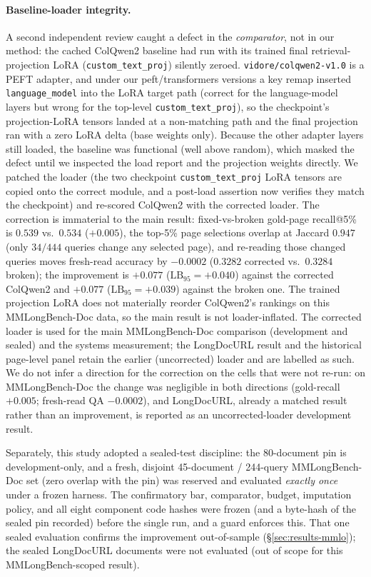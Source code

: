 \documentclass[letterpaper]{article} %
\newcommand{\lb}{\mathrm{LB}_{95}}
\begin{document}
\paragraph{Baseline-loader integrity.} A second independent review caught a defect in the \emph{comparator}, not in our method: the cached ColQwen2 baseline had run with its trained final retrieval-projection LoRA (\texttt{custom\_text\_proj}) silently zeroed. \texttt{vidore/colqwen2-v1.0} is a PEFT adapter, and under our peft/transformers versions a key remap inserted \texttt{language\_model} into the LoRA target path (correct for the language-model layers but wrong for the top-level \texttt{custom\_text\_proj}), so the checkpoint's projection-LoRA tensors landed at a non-matching path and the final projection ran with a zero LoRA delta (base weights only). Because the other adapter layers still loaded, the baseline was functional (well above random), which masked the defect until we inspected the load report and the projection weights directly. We patched the loader (the two checkpoint \texttt{custom\_text\_proj} LoRA tensors are copied onto the correct module, and a post-load assertion now verifies they match the checkpoint) and re-scored ColQwen2 with the corrected loader. The correction is immaterial to the main result: fixed-vs-broken gold-page recall@5\% is $0.539$ vs.\ $0.534$ ($+0.005$), the top-5\% page selections overlap at Jaccard $0.947$ (only $34/444$ queries change any selected page), and re-reading those changed queries moves fresh-read accuracy by $-0.0002$ ($0.3282$ corrected vs.\ $0.3284$ broken); the improvement is $+0.077$ ($\lb=+0.040$) against the corrected ColQwen2 and $+0.077$ ($\lb=+0.039$) against the broken one. The trained projection LoRA does not materially reorder ColQwen2's rankings on this MMLongBench-Doc data, so the main result is not loader-inflated. The corrected loader is used for the main MMLongBench-Doc comparison (development and sealed) and the systems measurement; the LongDocURL result and the historical page-level panel retain the earlier (uncorrected) loader and are labelled as such. We do not infer a direction for the correction on the cells that were not re-run: on MMLongBench-Doc the change was negligible in both directions (gold-recall $+0.005$; fresh-read QA $-0.0002$), and LongDocURL, already a matched result rather than an improvement, is reported as an uncorrected-loader development result.

Separately, this study adopted a sealed-test discipline: the 80-document pin is development-only, and a fresh, disjoint 45-document / 244-query MMLongBench-Doc set (zero overlap with the pin) was reserved and evaluated \emph{exactly once} under a frozen harness. The confirmatory bar, comparator, budget, imputation policy, and all eight component code hashes were frozen (and a byte-hash of the sealed pin recorded) before the single run, and a guard enforces this. That one sealed evaluation confirms the improvement out-of-sample (\S\ref{sec:results-mmlo}); the sealed LongDocURL documents were not evaluated (out of scope for this MMLongBench-scoped result).
\end{document}
